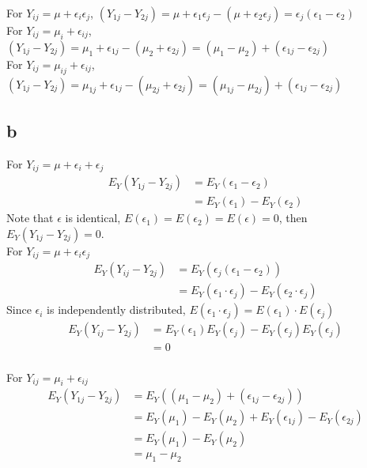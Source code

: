 \documentclass[11pt,letterpaper]{article}
\begin{document}
\noindent For $Y_{ij} = \mu + \epsilon_i \epsilon_j$, $(Y_{1j} - Y_{2j}) = \mu + \epsilon_1 \epsilon_j - (\mu + \epsilon_2 \epsilon_j) = \epsilon_j (\epsilon_1 - \epsilon_2)$ \\

\noindent For $Y_{ij} = \mu_i + \epsilon_{ij}$, $(Y_{1j} - Y_{2j}) = \mu_1 + \epsilon_{1j} - (\mu_2 + \epsilon_{2j}) = (\mu_1 - \mu_2) + (\epsilon_{1j} - \epsilon_{2j})$ \\

\noindent For $Y_{ij} = \mu_{ij} + \epsilon_{ij}$, $(Y_{1j} - Y_{2j}) =  \mu_{1j} + \epsilon_{1j} - (\mu_{2j} + \epsilon_{2j}) = (\mu_{1j} - \mu_{2j}) + (\epsilon_{1j} - \epsilon_{2j})$ \\

\subsection*{b}
For $Y_{ij} = \mu + \epsilon_i + \epsilon_j$
\begin{align*}
E_Y(Y_{1j} - Y_{2j}) &= E_Y(\epsilon_1 - \epsilon_2) \\
&= E_Y(\epsilon_1) - E_Y(\epsilon_2)
\end{align*}
\noindent Note that $\epsilon$ is identical, $E(\epsilon_1) = E(\epsilon_2) = E(\epsilon) = 0$, then $E_Y(Y_{1j} - Y_{2j}) = 0$. \\

\noindent For $Y_{ij} = \mu + \epsilon_i \epsilon_j$
\begin{align*}
E_Y(Y_{ij} - Y_{2j}) &= E_Y( \epsilon_j (\epsilon_1 - \epsilon_2) ) \\
&= E_Y(\epsilon_1 \cdot \epsilon_j) - E_Y(\epsilon_2 \cdot \epsilon_j)
\end{align*}
\noindent Since $\epsilon_i$ is independently distributed, $E(\epsilon_1 \cdot \epsilon_j) = E(\epsilon_1) \cdot E(\epsilon_j)$ 
\begin{align*}
E_Y(Y_{ij} - Y_{2j}) &= E_Y(\epsilon_1) E_Y(\epsilon_j) - E_Y(\epsilon_j) E_Y(\epsilon_j) \\
&= 0 \\
\end{align*}

\noindent For $Y_{ij} = \mu_i + \epsilon_{ij}$
\begin{align*}
E_Y(Y_{1j} - Y_{2j}) &= E_Y((\mu_1 - \mu_2) + (\epsilon_{1j} - \epsilon_{2j})) \\
&= E_Y(\mu_1) - E_Y(\mu_2) + E_Y(\epsilon_{1j}) - E_Y(\epsilon_{2j}) \\
&= E_Y(\mu_1) - E_Y(\mu_2) \\
&= \mu_1 - \mu_2 \\
\end{align*}
\end{document}
